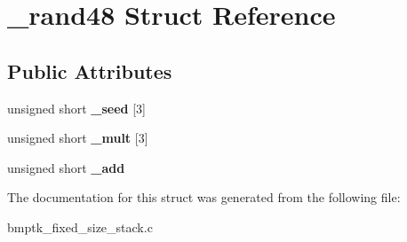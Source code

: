 \hypertarget{struct__rand48}{}\section{\+\_\+rand48 Struct Reference}
\label{struct__rand48}
\subsection*{Public Attributes}
\begin{DoxyCompactItemize}
\item 
unsigned short {\bfseries \+\_\+seed} \mbox{[}3\mbox{]}\hypertarget{struct__rand48_acc1e6c3720f9618e12d01ebdfc1d9e81}{}\label{struct__rand48_acc1e6c3720f9618e12d01ebdfc1d9e81}

\item 
unsigned short {\bfseries \+\_\+mult} \mbox{[}3\mbox{]}\hypertarget{struct__rand48_abddc795de8b4fa63abf45a8e9465b68a}{}\label{struct__rand48_abddc795de8b4fa63abf45a8e9465b68a}

\item 
unsigned short {\bfseries \+\_\+add}\hypertarget{struct__rand48_a23a6b28c89e2518ed58240777540c843}{}\label{struct__rand48_a23a6b28c89e2518ed58240777540c843}

\end{DoxyCompactItemize}


The documentation for this struct was generated from the following file\+:\begin{DoxyCompactItemize}
\item 
bmptk\+\_\+fixed\+\_\+size\+\_\+stack.\+c\end{DoxyCompactItemize}

